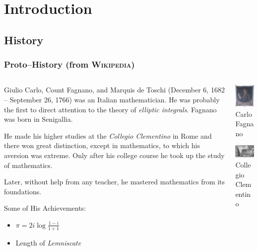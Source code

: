 \documentclass[10pt,handout]{beamer} %
\theoremstyle{definition}
\begin{document}
\section{Introduction}
\subsection{History}

\begin{frame}\frametitle{Proto--History (from \textsc{Wikipedia})}

\begin{columns}[c]
\begin{column}{6cm}%
Giulio Carlo, Count Fagnano, and Marquis de Toschi (December 6, 1682 -- September 26, 1766)
was an Italian mathematician. He was probably the first to direct attention to the theory of
\emph{elliptic integrals}. Fagnano was born in Senigallia.\medskip

He made his higher studies at the \emph{Collegio Clementino} in Rome and there won great distinction,
except in mathematics, to which his aversion was extreme. Only after his college course he took up the study of
mathematics.\medskip

Later, without help from any teacher, he mastered mathematics from its foundations.%
\begin{block}{Some of His Achievements:}
\begin{itemize}
 \item $\pi=2i\log\frac{1-i}{1+1}$
 \item Length of \emph{Lemniscate}
\end{itemize}
\end{block}
\end{column}
\begin{column}{4cm}
\includegraphics[width=2.5cm]{images/fagnano.jpg}\\
{Carlo Fagnano}
\smallskip

\includegraphics[width=2.5cm]{images/ColegioClementino.jpg}\\
{Collegio Clementino}
\smallskip


\end{column}
\end{columns}
\end{frame}
\end{document}
